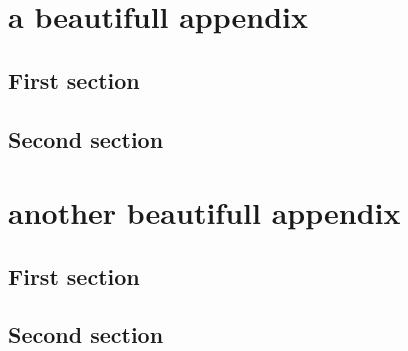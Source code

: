 \documentclass[twoside]{phdens} %
\begin{document}
\dominitoc%








\setcounter{tocdepth}{1}

\tableofcontents
\adjustmtc

\clearpage
{}
\setcounter{page}{1}








\appendix

\chapter{a beautifull appendix}
\section{First section}\lipsum
\section{Second section}\lipsum
\chapter{another beautifull appendix}
\section{First section}\lipsum
\section{Second section}\lipsum
\end{document}

